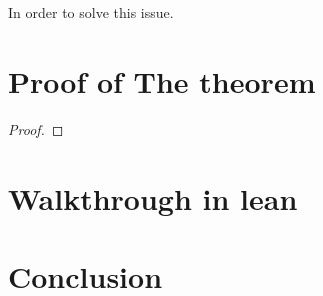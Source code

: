 \documentclass[11pt]{article}
\begin{document}
In order to solve this issue.

\section*{ Proof of The theorem }


\begin{proof}

\end{proof}
\section*{ Walkthrough in lean }
\section*{ Conclusion }
\end{document}
